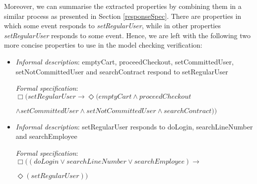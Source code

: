 Moreover, we can summarise the extracted properties by combining them in a similar process as presented in Section \ref{responseSpec}. There are properties in which some event responds to \textit{setRegularUser}, while in other properties \textit{setRegularUser} responds to some event. Hence, we are left with the following two more concise properties to use in the model checking verification:

\begin{itemize}

\item \textit{Informal description}: emptyCart, proceedCheckout, setCommittedUser, setNotCommittedUser and searchContract respond to setRegularUser

\textit{Formal specification}: $\Box(setRegularUser \rightarrow \Diamond(emptyCart \wedge proceedCheckout$

$ \wedge setCommittedUser \wedge setNotCommittedUser \wedge searchContract))$

\item \textit{Informal description}: setRegularUser responds to doLogin, searchLineNumber and searchEmployee

\textit{Formal specification}: $\Box ((doLogin \vee searchLineNumber \vee searchEmployee) \rightarrow $

$\Diamond(setRegularUser))$

\end{itemize}

\iffalse
\begin{table}[h]
\begin{center}
\begin{tabular}{|p{7cm}|p{10cm}|}

\hline

Informal description & Formal specification \\ \hline

emptyCart, proceedCheckout, setCommittedUser, setNotCommittedUser and searchContract respond to setRegularUser & $\Box (setRegularUser \rightarrow \Diamond (emptyCart \wedge proceedCheckout \wedge setCommittedUser \wedge setNotCommittedUser \wedge searchContract))$ \\ \hline
setRegularUser responds to doLogin, searchLineNumber and searchEmployee & $\Box ((doLogin \vee searchLineNumber \vee searchEmployee) \rightarrow \Diamond(setRegularUser))$ \\

\hline
\end{tabular}
\end{center}
\caption{Combined properties from \ref{specificProperties}}
\label{specificPropertiesCombined}
\end{table}
\fi
